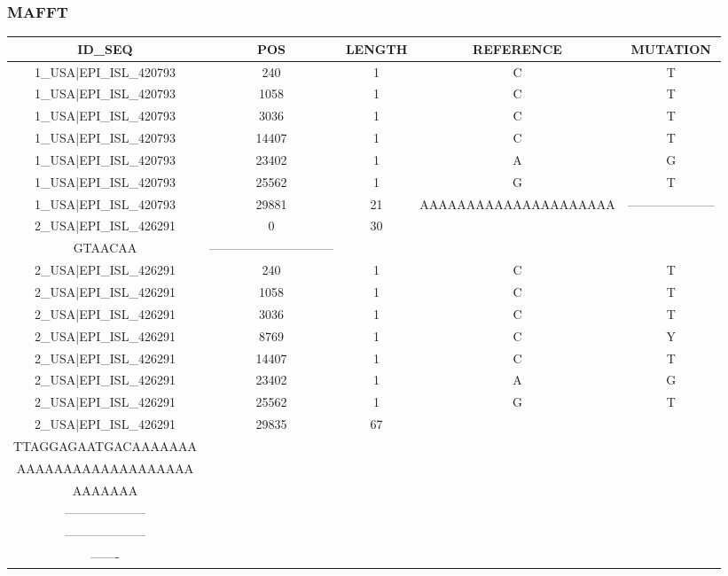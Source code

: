 \documentclass[a4paper,10pt]{article}
\begin{document}
\newpage
\subsubsection{MAFFT}


\setlength\LTleft{-2.4 cm}
\begin{longtable}{@{}ccccc@{}}
\toprule
\textbf{ID\_SEQ} & \textbf{POS} & \textbf{LENGTH} & \textbf{REFERENCE} & \textbf{MUTATION} \\* \midrule
\endfirsthead
%
\cline{1-5}
\endhead
%
1\_USA|EPI\_ISL\_420793 & 240 & 1 & C & T \\* \midrule
1\_USA|EPI\_ISL\_420793 & 1058 & 1 & C & T \\* \midrule
1\_USA|EPI\_ISL\_420793 & 3036 & 1 & C & T \\* \midrule
1\_USA|EPI\_ISL\_420793 & 14407 & 1 & C & T \\* \midrule
1\_USA|EPI\_ISL\_420793 & 23402 & 1 & A & G \\* \midrule
1\_USA|EPI\_ISL\_420793 & 25562 & 1 & G & T \\* \midrule
1\_USA|EPI\_ISL\_420793 & 29881 & 21 & AAAAAAAAAAAAAAAAAAAAA & --------------------- \\* \midrule
2\_USA|EPI\_ISL\_426291 & 0 & 30 & \begin{tabular}[c]{@{}c@{}}ATTAAAGGTTTATACCTTCCCAG\\ GTAACAA\end{tabular} & ------------------------------ \\* \midrule
2\_USA|EPI\_ISL\_426291 & 240 & 1 & C & T \\* \midrule
2\_USA|EPI\_ISL\_426291 & 1058 & 1 & C & T \\* \midrule
2\_USA|EPI\_ISL\_426291 & 3036 & 1 & C & T \\* \midrule
2\_USA|EPI\_ISL\_426291 & 8769 & 1 & C & Y \\* \midrule
2\_USA|EPI\_ISL\_426291 & 14407 & 1 & C & T \\* \midrule
2\_USA|EPI\_ISL\_426291 & 23402 & 1 & A & G \\* \midrule
2\_USA|EPI\_ISL\_426291 & 25562 & 1 & G & T \\* \midrule
2\_USA|EPI\_ISL\_426291 & 29835 & 67 & \begin{tabular}[c]{@{}c@{}}CCATGTGATTTTAATAGCTTC\\ TTAGGAGAATGACAAAAAAA\\ AAAAAAAAAAAAAAAAAAA\\ AAAAAAA\end{tabular} & \begin{tabular}[c]{@{}c@{}}--------------------\\ --------------------\\ --------------------\\ -------\end{tabular} \\* \midrule

\end{longtable}
\end{document}
